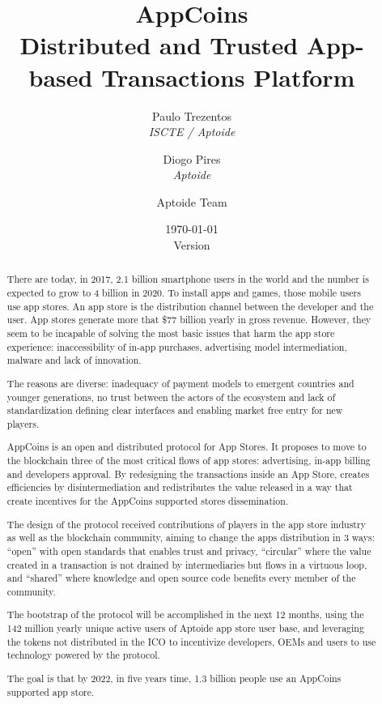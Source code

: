 \documentclass[12pt, a4paper, titlepage]{article}
\title{AppCoins\\ Distributed and Trusted App-based Transactions Platform}
\author{\small Paulo Trezentos  \\
  {\em  ISCTE / Aptoide}  \\
  \and 
\small  Diogo Pires \\
  {\em Aptoide} \\
  \and
  Aptoide Team
  }
\date{\today\\\normalsize Version \versionnumber}
\begin{document}
\maketitle


\begin{abstract}

There are today, in 2017, 2.1 billion smartphone users in the world and the number is expected to grow to  4 billion in 2020. To install apps and games, those mobile users use app stores. An app store is the distribution channel between the developer and the user. App stores generate more that \$77 billion yearly in gross revenue.  However, they seem to be incapable of solving the most basic issues that harm the app store experience: inaccessibility of in-app purchases, advertising model intermediation, malware and lack of innovation.

The reasons are diverse: inadequacy of payment models to emergent countries and younger generations, no trust between the actors of the ecosystem and lack of standardization defining clear interfaces and enabling market free entry for new players.

AppCoins is an open and distributed protocol for App Stores. It proposes to move to the blockchain three of the most critical flows of app stores: advertising, in-app billing and developers approval. By redesigning the transactions inside an App Store, creates efficiencies by disintermediation and redistributes the value released in a way that create incentives for the AppCoins supported stores dissemination.

The design of the protocol received contributions of players in the app store industry as well as the blockchain community, aiming to change the apps distribution in 3 ways: ``open'' with open standards that enables trust and privacy, ``circular'' where the value created in a transaction is not drained by intermediaries but flows in a virtuous loop, and ``shared'' where knowledge and open source code benefits every member of the community.

The bootstrap of the protocol will be accomplished in the next 12 months, using the 142 million yearly unique active users of Aptoide app store user base, and leveraging the tokens not distributed in the ICO to incentivize developers, OEMs and users to use technology powered by the protocol.

The goal is that by 2022, in five years time, 1.3 billion people use an AppCoins supported app store.


\end{abstract}
\end{document}
